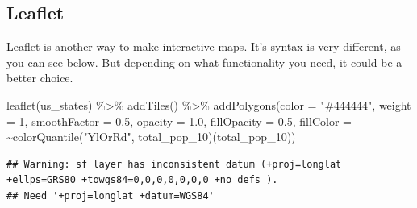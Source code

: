 \documentclass[
]{book}
\newenvironment{Shaded}{\begin{snugshade}}{\end{snugshade}}
\newcommand{\AttributeTok}[1]{\textcolor[rgb]{0.77,0.63,0.00}{#1}}
\newcommand{\DecValTok}[1]{\textcolor[rgb]{0.00,0.00,0.81}{#1}}
\newcommand{\FloatTok}[1]{\textcolor[rgb]{0.00,0.00,0.81}{#1}}
\newcommand{\FunctionTok}[1]{\textcolor[rgb]{0.00,0.00,0.00}{#1}}
\newcommand{\NormalTok}[1]{#1}
\newcommand{\SpecialCharTok}[1]{\textcolor[rgb]{0.00,0.00,0.00}{#1}}
\newcommand{\StringTok}[1]{\textcolor[rgb]{0.31,0.60,0.02}{#1}}
\begin{document}
\hypertarget{htmlwidget-c593ac0c756e4ddc5d42}{}

\hypertarget{leaflet}{%
\subsection{Leaflet}\label{leaflet}}

Leaflet is another way to make interactive maps. It's syntax is very different, as you can see below. But depending on what functionality you need, it could be a better choice.

\begin{Shaded}
\begin{Highlighting}[]
\FunctionTok{leaflet}\NormalTok{(us\_states) }\SpecialCharTok{\%\textgreater{}\%} 
  \FunctionTok{addTiles}\NormalTok{() }\SpecialCharTok{\%\textgreater{}\%}
  \FunctionTok{addPolygons}\NormalTok{(}\AttributeTok{color =} \StringTok{"\#444444"}\NormalTok{, }\AttributeTok{weight =} \DecValTok{1}\NormalTok{, }\AttributeTok{smoothFactor =} \FloatTok{0.5}\NormalTok{,}
    \AttributeTok{opacity =} \FloatTok{1.0}\NormalTok{, }\AttributeTok{fillOpacity =} \FloatTok{0.5}\NormalTok{,}
    \AttributeTok{fillColor =} \SpecialCharTok{\textasciitilde{}}\FunctionTok{colorQuantile}\NormalTok{(}\StringTok{"YlOrRd"}\NormalTok{, total\_pop\_10)(total\_pop\_10))}
\end{Highlighting}
\end{Shaded}

\begin{verbatim}
## Warning: sf layer has inconsistent datum (+proj=longlat +ellps=GRS80 +towgs84=0,0,0,0,0,0,0 +no_defs ).
## Need '+proj=longlat +datum=WGS84'
\end{verbatim}

\hypertarget{htmlwidget-7cfe8b0bcb2edcbbdce1}{}

  
\end{document}
